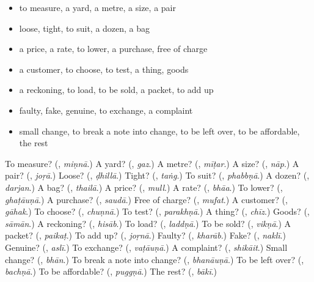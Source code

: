\begin{itemize}
\raggedright
  \item to measure, a yard, a metre, a size, a pair
  \item loose, tight, to suit, a dozen, a bag
  \item a price, a rate, to lower, a purchase, free of charge
  \item a customer, to choose, to test, a thing, goods
  \item a reckoning, to load, to be sold, a packet, to add up
  \item faulty, fake, genuine, to exchange, a complaint
  \item small change, to break a note into change, to be left over, to be affordable, the rest
\end{itemize}

\begin{tcolorbox}[breakable,colback=teal!4,colframe=teal!35!black,title={Before you move on}]
To measure? (\textbf{}, \emph{miṇnā}.) A yard? (\textbf{}, \emph{gaz}.) A metre? (\textbf{}, \emph{mīṭar}.) A size? (\textbf{}, \emph{nāp}.) A pair? (\textbf{}, \emph{joṛā}.) Loose? (\textbf{}, \emph{ḍhillā}.) Tight? (\textbf{}, \emph{taṅg}.) To suit? (\textbf{}, \emph{phabbṇā}.) A dozen? (\textbf{}, \emph{darjan}.) A bag? (\textbf{}, \emph{thailā}.) A price? (\textbf{}, \emph{mull}.) A rate? (\textbf{}, \emph{bhāa}.) To lower? (\textbf{}, \emph{ghaṭāuṇā}.) A purchase? (\textbf{}, \emph{saudā}.) Free of charge? (\textbf{}, \emph{mufat}.) A customer? (\textbf{}, \emph{gāhak}.) To choose? (\textbf{}, \emph{chuṇnā}.) To test? (\textbf{}, \emph{parakhṇā}.) A thing? (\textbf{}, \emph{chīz}.) Goods? (\textbf{}, \emph{sāmān}.) A reckoning? (\textbf{}, \emph{hisāb}.) To load? (\textbf{}, \emph{laddṇā}.) To be sold? (\textbf{}, \emph{vikṇā}.) A packet? (\textbf{}, \emph{paikaṭ}.) To add up? (\textbf{}, \emph{joṛnā}.) Faulty? (\textbf{}, \emph{kharāb}.) Fake? (\textbf{}, \emph{naklī}.) Genuine? (\textbf{}, \emph{aslī}.) To exchange? (\textbf{}, \emph{vaṭāuṇā}.) A complaint? (\textbf{}, \emph{shikāit}.) Small change? (\textbf{}, \emph{bhān}.) To break a note into change? (\textbf{}, \emph{bhanāuṇā}.) To be left over? (\textbf{}, \emph{bachṇā}.) To be affordable? (\textbf{}, \emph{puggṇā}.) The rest? (\textbf{}, \emph{bākī}.)
\end{tcolorbox}
